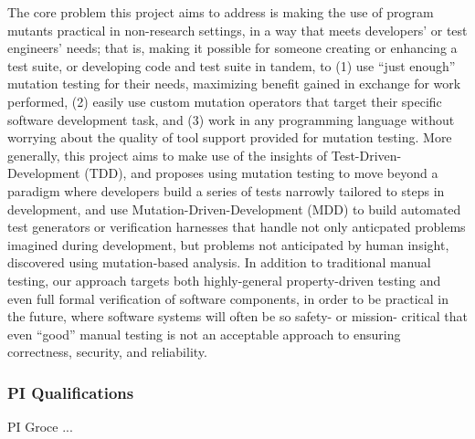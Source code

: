 The core problem this project aims to address is making the use of program mutants practical in non-research settings, in a way that meets developers' or test engineers' needs; that is, making it possible for someone creating or enhancing a test suite, or developing code and test suite in tandem, to (1) use ``just enough'' mutation testing for their needs, maximizing benefit gained in exchange for work performed, (2) easily use custom mutation operators that target their specific software development task, and (3) work in any programming language without worrying about the quality of tool support provided for mutation testing.  More generally, this project aims to make use of the insights of Test-Driven-Development (TDD), and proposes using mutation testing to move beyond a paradigm where developers build a series of tests narrowly tailored to steps in development, and use Mutation-Driven-Development (MDD) to build automated test generators or verification harnesses that handle not only anticpated problems imagined during development, but problems not anticipated by human insight, discovered using mutation-based analysis.  In addition to traditional manual testing, our approach targets both highly-general property-driven testing and even full formal verification of software components, in order to be practical in the future, where software systems will often be so safety- or mission- critical that even ``good'' manual testing is not an acceptable approach to ensuring correctness, security, and reliability.



\subsubsection{PI Qualifications}

PI Groce ...
